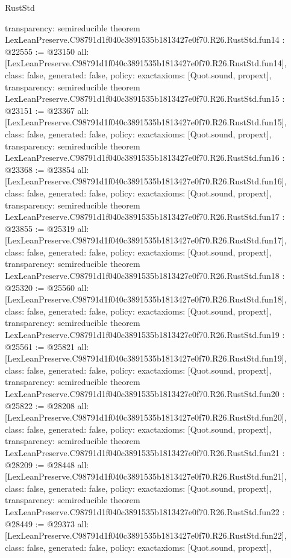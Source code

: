 \begin{lexlean}{RustStd}
\begin{coremodule}
{  transparency: semireducible
}
theorem LexLeanPreserve.C98791d1f040c3891535b1813427e0f70.R26.RustStd.fun14 : @22555 := @23150 {
  all: [LexLeanPreserve.C98791d1f040c3891535b1813427e0f70.R26.RustStd.fun14],
  class: false,
  generated: false,
  policy: exact{axioms: [Quot.sound, propext]},
  transparency: semireducible
}
theorem LexLeanPreserve.C98791d1f040c3891535b1813427e0f70.R26.RustStd.fun15 : @23151 := @23367 {
  all: [LexLeanPreserve.C98791d1f040c3891535b1813427e0f70.R26.RustStd.fun15],
  class: false,
  generated: false,
  policy: exact{axioms: [Quot.sound, propext]},
  transparency: semireducible
}
theorem LexLeanPreserve.C98791d1f040c3891535b1813427e0f70.R26.RustStd.fun16 : @23368 := @23854 {
  all: [LexLeanPreserve.C98791d1f040c3891535b1813427e0f70.R26.RustStd.fun16],
  class: false,
  generated: false,
  policy: exact{axioms: [Quot.sound, propext]},
  transparency: semireducible
}
theorem LexLeanPreserve.C98791d1f040c3891535b1813427e0f70.R26.RustStd.fun17 : @23855 := @25319 {
  all: [LexLeanPreserve.C98791d1f040c3891535b1813427e0f70.R26.RustStd.fun17],
  class: false,
  generated: false,
  policy: exact{axioms: [Quot.sound, propext]},
  transparency: semireducible
}
theorem LexLeanPreserve.C98791d1f040c3891535b1813427e0f70.R26.RustStd.fun18 : @25320 := @25560 {
  all: [LexLeanPreserve.C98791d1f040c3891535b1813427e0f70.R26.RustStd.fun18],
  class: false,
  generated: false,
  policy: exact{axioms: [Quot.sound, propext]},
  transparency: semireducible
}
theorem LexLeanPreserve.C98791d1f040c3891535b1813427e0f70.R26.RustStd.fun19 : @25561 := @25821 {
  all: [LexLeanPreserve.C98791d1f040c3891535b1813427e0f70.R26.RustStd.fun19],
  class: false,
  generated: false,
  policy: exact{axioms: [Quot.sound, propext]},
  transparency: semireducible
}
theorem LexLeanPreserve.C98791d1f040c3891535b1813427e0f70.R26.RustStd.fun20 : @25822 := @28208 {
  all: [LexLeanPreserve.C98791d1f040c3891535b1813427e0f70.R26.RustStd.fun20],
  class: false,
  generated: false,
  policy: exact{axioms: [Quot.sound, propext]},
  transparency: semireducible
}
theorem LexLeanPreserve.C98791d1f040c3891535b1813427e0f70.R26.RustStd.fun21 : @28209 := @28448 {
  all: [LexLeanPreserve.C98791d1f040c3891535b1813427e0f70.R26.RustStd.fun21],
  class: false,
  generated: false,
  policy: exact{axioms: [Quot.sound, propext]},
  transparency: semireducible
}
theorem LexLeanPreserve.C98791d1f040c3891535b1813427e0f70.R26.RustStd.fun22 : @28449 := @29373 {
  all: [LexLeanPreserve.C98791d1f040c3891535b1813427e0f70.R26.RustStd.fun22],
  class: false,
  generated: false,
  policy: exact{axioms: [Quot.sound, propext]},
}
\end{coremodule}
\end{lexlean}
